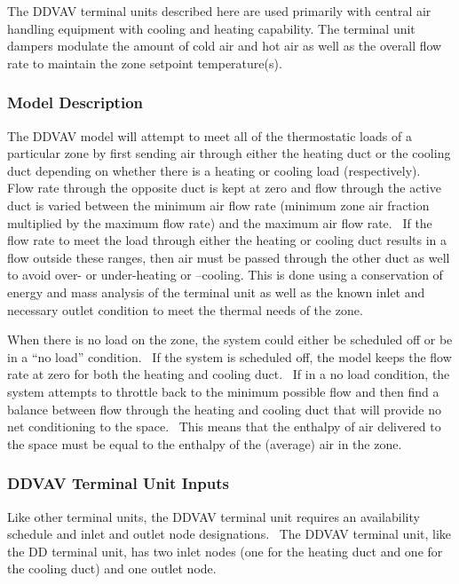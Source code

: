 The DDVAV terminal units described here are used primarily with central air handling equipment with cooling and heating capability. The terminal unit dampers modulate the amount of cold air and hot air as well as the overall flow rate to maintain the zone setpoint temperature(s).

\subsubsection{Model Description}\label{model-description-3-000}

The DDVAV model will attempt to meet all of the thermostatic loads of a particular zone by first sending air through either the heating duct or the cooling duct depending on whether there is a heating or cooling load (respectively).~ Flow rate through the opposite duct is kept at zero and flow through the active duct is varied between the minimum air flow rate (minimum zone air fraction multiplied by the maximum flow rate) and the maximum air flow rate.~ If the flow rate to meet the load through either the heating or cooling duct results in a flow outside these ranges, then air must be passed through the other duct as well to avoid over- or under-heating or --cooling. This is done using a conservation of energy and mass analysis of the terminal unit as well as the known inlet and necessary outlet condition to meet the thermal needs of the zone.

When there is no load on the zone, the system could either be scheduled off or be in a ``no load'' condition.~ If the system is scheduled off, the model keeps the flow rate at zero for both the heating and cooling duct.~ If in a no load condition, the system attempts to throttle back to the minimum possible flow and then find a balance between flow through the heating and cooling duct that will provide no net conditioning to the space.~ This means that the enthalpy of air delivered to the space must be equal to the enthalpy of the (average) air in the zone.

\subsubsection{DDVAV Terminal Unit Inputs}\label{ddvav-terminal-unit-inputs}

Like other terminal units, the DDVAV terminal unit requires an availability schedule and inlet and outlet node designations.~ The DDVAV terminal unit, like the DD terminal unit, has two inlet nodes (one for the heating duct and one for the cooling duct) and one outlet node.

